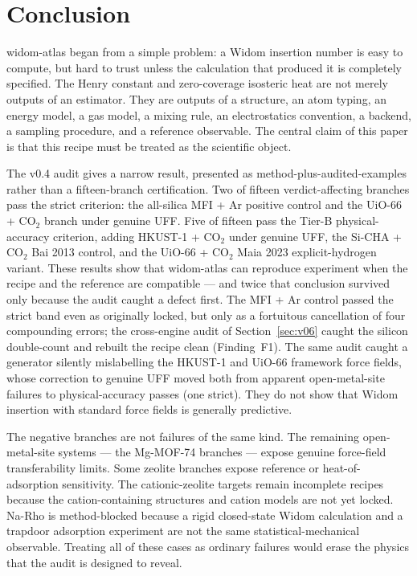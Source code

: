 \section{Conclusion}\label{sec:conclusion}

widom-atlas began from a simple problem: a Widom insertion number is easy to compute, but hard to trust unless the calculation that produced it is completely specified. The Henry constant and zero-coverage isosteric heat are not merely outputs of an estimator. They are outputs of a structure, an atom typing, an energy model, a gas model, a mixing rule, an electrostatics convention, a backend, a sampling procedure, and a reference observable. The central claim of this paper is that this recipe must be treated as the scientific object.

The v0.4 audit gives a narrow result, presented as method-plus-audited-examples rather than a fifteen-branch certification. Two of fifteen verdict-affecting branches pass the strict criterion: the all-silica MFI + Ar positive control and the UiO-66 + CO\(_2\) branch under genuine UFF. Five of fifteen pass the Tier-B physical-accuracy criterion, adding HKUST-1 + CO\(_2\) under genuine UFF, the Si-CHA + CO\(_2\) Bai 2013 control, and the UiO-66 + CO\(_2\) Maia 2023 explicit-hydrogen variant. These results show that widom-atlas can reproduce experiment when the recipe and the reference are compatible --- and twice that conclusion survived only because the audit caught a defect first. The MFI + Ar control passed the strict band even as originally locked, but only as a fortuitous cancellation of four compounding errors; the cross-engine audit of Section~\ref{sec:v06} caught the silicon double-count and rebuilt the recipe clean (Finding~F1). The same audit caught a generator silently mislabelling the HKUST-1 and UiO-66 framework force fields, whose correction to genuine UFF moved both from apparent open-metal-site failures to physical-accuracy passes (one strict). They do not show that Widom insertion with standard force fields is generally predictive.

The negative branches are not failures of the same kind. The remaining open-metal-site systems --- the Mg-MOF-74 branches --- expose genuine force-field transferability limits. Some zeolite branches expose reference or heat-of-adsorption sensitivity. The cationic-zeolite targets remain incomplete recipes because the cation-containing structures and cation models are not yet locked. Na-Rho is method-blocked because a rigid closed-state Widom calculation and a trapdoor adsorption experiment are not the same statistical-mechanical observable. Treating all of these cases as ordinary failures would erase the physics that the audit is designed to reveal.

